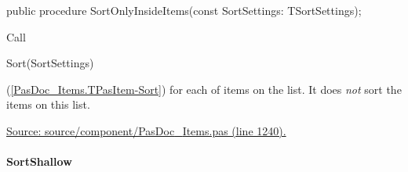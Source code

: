 \documentclass{report}
\newif\ifpdf
\begin{document}
\label{PasDoc_Items.TPasItems-SortOnlyInsideItems}
\begin{list}{}{
\setlength{\itemindent}{0cm}
\setlength{\listparindent}{0cm}
\setlength{\leftmargin}{\evensidemargin}
\addtolength{\leftmargin}{\tmplength}
\settowidth{\labelsep}{X}
\addtolength{\leftmargin}{\labelsep}
\setlength{\labelwidth}{\tmplength}
}
\item[\textbf{Declaration}\hfill]
\ifpdf
\begin{flushleft}
\fi
\begin{ttfamily}
public procedure SortOnlyInsideItems(const SortSettings: TSortSettings);\end{ttfamily}

\ifpdf
\end{flushleft}
\fi

\par
\item[\textbf{Description}]
Call \begin{ttfamily}Sort(SortSettings)\end{ttfamily}(\ref{PasDoc_Items.TPasItem-Sort}) for each of items on the list. It does \textit{not} sort the items on this list.\par
\href{https://github.com/pasdoc/pasdoc/blob/master/source/component/PasDoc_Items.pas#L1240}{Source: source/component/PasDoc{\_}Items.pas (line 1240).}

\end{list}
\paragraph*{SortShallow}\hspace*{\fill}
\end{document}
